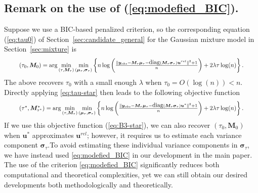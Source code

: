 \documentclass[12pt]{article}
\theoremstyle{shortspace}
\def\*#1{\bm{#1}}
\newcommand{\diag}{\hbox{diag}}
\begin{document}
\subsection{Remark on the use of (\ref{eq:modefied_BIC}).} \label{sec:BIC}
Suppose we use a BIC-based penalized criterion, so the corresponding equation (\ref{eq:tau0}) of Section~\ref{sec:candidate_general} for 
the Gaussian mixture model in Section~\ref{sec:mixture}
is 
\begin{align}\label{eq:B3-tau0}
\resizebox{.92\hsize}{!}{$(\tau_0, \*M_0) =\arg\min\limits_{(\tau, \*M_\tau)} \min\limits_{(\*\mu_\tau, \*\sigma_\tau)}  \left\{n\log \bigg(\frac{\|\*y_{obs} - {\*M}_{\tau} {\*\mu}_{\tau} - \diag(\*M_{\tau}  {\*\sigma_\tau}) \*u^{rel}\|^2+1}{n}\bigg) + 2\lambda\tau\log(n)\right\}.$}
\end{align}
{The above recovers $\tau_0$ with a small enough $\lambda$ when $\tau_0 = O(\log(n)) < n.$}
Directly applying \eqref{eq:tau-star} then leads to the following objective function
\begin{align}\label{eq:B3-star}
\resizebox{.92\hsize}{!}{$(\tau^*, \*M^*_{\tau^*}) =\arg\min\limits_{(\tau, \*M_\tau)} \min\limits_{(\*\mu_\tau, \*\sigma_\tau)}  \left\{n\log \bigg(\frac{\|\*y_{obs} - {\*M}_{\tau} {\*\mu}_{\tau} - \diag(\*M_{\tau}  {\*\sigma_\tau}) \*u^*\|^2+1}{n}\bigg) + 2\lambda\tau\log(n)\right\}.$}
\end{align}
If we use this objective function (\ref{eq:B3-star}), 
we can also recover $(\tau_0, \*M_0)$ when $\*u^*$ approximates $\*u^{rel}$;  however, it requires us to  estimate each variance component $\*\sigma_\tau.$To avoid 
 estimating these individual variance components in  $\*\sigma_\tau$, 
we have instead used \eqref{eq:modefied_BIC}
in our development in the main paper. The use of the criterion  \eqref{eq:modefied_BIC} significantly reduces both computational and theoretical complexities, yet we can still obtain our desired developments both methodologically and theoretically.
\end{document}
